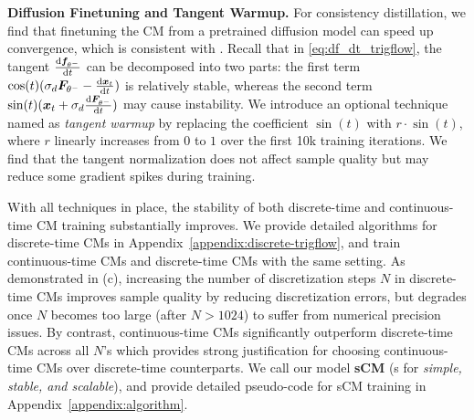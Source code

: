 \textbf{Diffusion Finetuning and Tangent Warmup. } 
For consistency distillation, we find that finetuning the CM from a pretrained diffusion model can speed up convergence, which is consistent with \citet{song2023cm,geng2024ect}. Recall that in \eqref{eq:df_dt_trigflow}, the tangent $\frac{\mathrm{d} {\bm{f}}_{\theta^-}}{\mathrm{d} t}$ can be decomposed into two parts: the first term $\cos(t)(\sigma_d{\bm{F}}_{\theta^-} - \frac{\mathrm{d} {\bm{x}}_t}{\mathrm{d} t})$ is relatively stable, whereas the second term $\sin(t)({\bm{x}}_t + \sigma_d\frac{\mathrm{d} {\bm{F}}_{\theta^-}}{\mathrm{d} t})$ may cause instability. We introduce an optional technique named as \textit{tangent warmup} by replacing the coefficient $\sin(t)$ with $r \cdot \sin(t)$, where $r$ linearly increases from $0$ to $1$ over the first 10k training iterations. We find that the tangent normalization does not affect sample quality but may reduce some gradient spikes during training.

With all techniques in place, the stability of both discrete-time and continuous-time CM training substantially improves. We provide detailed algorithms for discrete-time CMs in Appendix~\ref{appendix:discrete-trigflow}, and train continuous-time CMs and discrete-time CMs with the same setting. As demonstrated in (c), increasing the number of discretization steps $N$ in discrete-time CMs improves sample quality by reducing discretization errors, but degrades once $N$ becomes too large (after $N>1024$) to suffer from numerical precision issues. By contrast, continuous-time CMs significantly outperform discrete-time CMs across all $N$'s which provides strong justification for choosing continuous-time CMs over discrete-time counterparts. We call our model \textbf{sCM} (s for \emph{simple, stable, and scalable}), and provide detailed pseudo-code for sCM training in Appendix~\ref{appendix:algorithm}.







